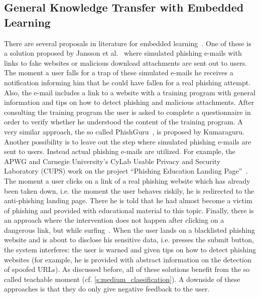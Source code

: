 \subsection{General Knowledge Transfer with Embedded Learning}

There are several proposals in literature for embedded learning~\cite{embedded2011jansson, kumaraguru2009phishguru,alnajim2009antiphishing}. 
One of these is a solution proposed by Jansson et al.~\cite{embedded2011jansson} where simulated phishing e-mails with links to fake websites or malicious download attachments are sent out to users. 
The moment a user falls for a trap of these simulated e-mails he receives a notification informing him that he could have fallen for a real phishing attempt. 
Also, the e-mail includes a link to a website with a training program with general information and tips on how to detect phishing and malicious attachments. 
After consulting the training program the user is asked to complete a questionnaire in order to verify whether he understood the content of the training program. 
A very similar approach, the so called PhishGuru~\cite{kumaraguru2009phishguru}, is proposed by Kumaraguru. 
Another possibility is to leave out the step where simulated phishing e-mails are sent to users. 
Instead actual phishing e-mails are utilized. 
For example, the APWG and Carnegie University's CyLab Usable Privacy and Security Laboratory (CUPS) work on the project ``Phishing Education Landing Page''~\cite{apwg2009landingpage}. 
The moment a user clicks on a link of a real phishing website which has already been taken down, i.e. the moment the user behaves riskily, he is redirected to the anti-phishing landing page.
There he is told that he had almost become a victim of phishing and provided with educational material to this topic. 
Finally, there is an approach where the intervention does not happen after clicking on a dangerous link, but while surfing~\cite{alnajim2009antiphishing}. 
When the user lands on a blacklisted phishing website and is about to disclose his sensitive data, i.e. presses the submit button, the system interferes: 
the user is warned and given tips on how to detect phishing websites (for example, he is provided with abstract information on the detection of spoofed URLs). 
As discussed before, all of these solutions benefit from the so called teachable moment (cf. \autoref{s:medium_classification}).
A downside of these approaches is that they do only give negative feedback to the user. 
